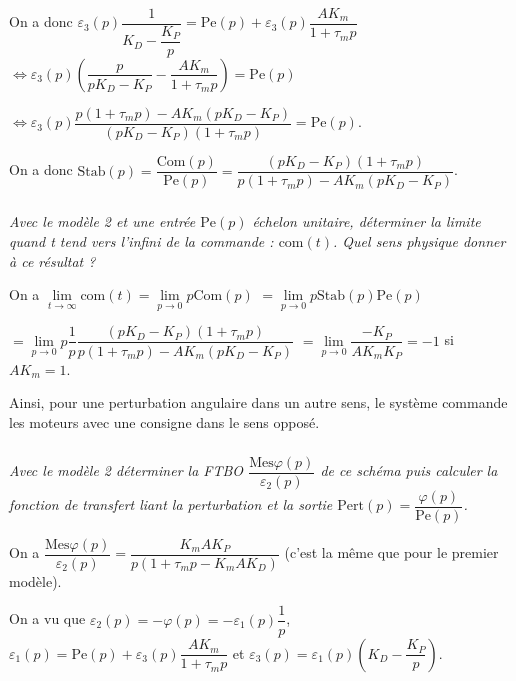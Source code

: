 \begin{multicols}{2}
\begin{corrige}
On a donc  $\varepsilon_3(p)\dfrac{1}{K_D -\dfrac{K_P}{p}}=\text{Pe}(p)+\varepsilon_3(p)\dfrac{AK_m}{1+\tau_m p} $ $\Leftrightarrow \varepsilon_3(p)\left(\dfrac{p}{pK_D-K_P } -\dfrac{AK_m}{1+\tau_m p}\right)=\text{Pe}(p) $ 

$\Leftrightarrow \varepsilon_3(p)\dfrac{p\left(1+\tau_m p \right) - AK_m \left( pK_D-K_P\right) }{\left(pK_D-K_P \right) \left(1+\tau_m p\right)}=\text{Pe}(p) $.

On a donc $\text{Stab}(p)=\dfrac{\text{Com}(p)}{\text{Pe}(p)}=\dfrac{\left(pK_D-K_P \right) \left(1+\tau_m p\right)}{p\left(1+\tau_m p \right) - AK_m \left( pK_D-K_P\right) }$.



 
\end{corrige}
\else
\fi

\subparagraph{\label{q28}}
\textit{Avec le modèle 2 et une entrée $\text{Pe}(p)$ échelon unitaire, déterminer la limite quand t tend vers
l’infini de la commande : $\text{com}(t)$. Quel sens physique donner à ce résultat ?}
\ifprof
\begin{corrige}
On a $\lim\limits_{t\to\infty}\text{com}(t) = \lim\limits_{p\to 0}p\text{Com}(p)$ 
$=\lim\limits_{p\to 0}p\text{Stab}(p)\text{Pe}(p)$ 

  $= \lim\limits_{p\to 0}p\dfrac{1}{p} \dfrac{\left(pK_D-K_P \right) \left(1+\tau_m p\right)}{p\left(1+\tau_m p \right) - AK_m \left( pK_D-K_P\right) }$
   $= \lim\limits_{p\to 0} \dfrac{-K_P }{  AK_m  K_P }=-1$ si $AK_m=1$.
  
  Ainsi, pour une perturbation angulaire dans un autre sens, le système commande les moteurs avec une consigne dans le sens opposé. 
\end{corrige}
\else
\fi

\subparagraph{}
\textit{Avec le modèle 2 déterminer la FTBO $\dfrac{\text{Mes}\varphi(p)}{\varepsilon_2(p)}$ de ce schéma puis calculer la fonction de transfert liant la perturbation et la sortie $\text{Pert}(p)=\dfrac{\varphi(p)}{\text{Pe}(p)}$.}
\ifprof
\begin{corrige}

On a  $\dfrac{\text{Mes}\varphi(p)}{\varepsilon_2(p)} = \dfrac{K_m A K_P}{p\left(1+\tau_m p-K_m A K_D \right)}$ (c'est la même que pour le premier modèle).

On a vu que  $\varepsilon_2(p) = -\varphi(p) = -\varepsilon_1(p)\dfrac{1}{p}$, $\varepsilon_1(p)=\text{Pe}(p)+\varepsilon_3(p)\dfrac{AK_m}{1+\tau_m p}$ et $\varepsilon_3(p)=\varepsilon_1(p)\left(K_D-\dfrac{K_P}{p} \right)$. 


\end{corrige}
\end{multicols}
